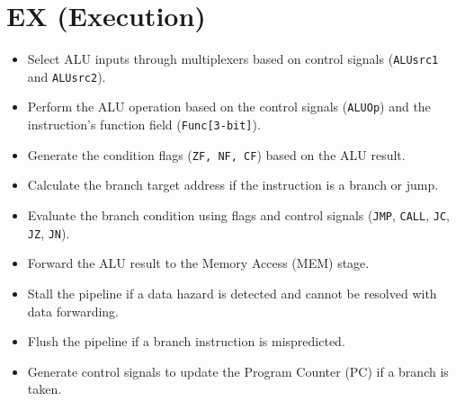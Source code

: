 \documentclass{report}
\begin{document}
\section*{EX (Execution)}
\begin{minipage}{0.6\textwidth}
\begin{itemize}
    \item Select ALU inputs through multiplexers based on control signals (\texttt{ALUsrc1} and \texttt{ALUsrc2}).
    \item Perform the ALU operation based on the control signals (\texttt{ALUOp}) and the instruction’s function field (\texttt{Func[3-bit]}).
    \item Generate the condition flags (\texttt{ZF, NF, CF}) based on the ALU result.
    \item Calculate the branch target address if the instruction is a branch or jump.
    \item Evaluate the branch condition using flags and control signals (\texttt{JMP}, \texttt{CALL}, \texttt{JC}, \texttt{JZ}, \texttt{JN}).
    \item Forward the ALU result to the Memory Access (MEM) stage.
    \item Stall the pipeline if a data hazard is detected and cannot be resolved with data forwarding.
    \item Flush the pipeline if a branch instruction is mispredicted.
    \item Generate control signals to update the Program Counter (PC) if a branch is taken.
\end{itemize}
\end{minipage}
\hspace{1cm}
\end{document}
